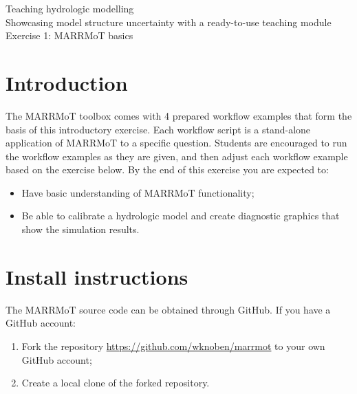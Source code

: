 \documentclass[12pt]{article}
\begin{document}

\begin{center}
Teaching hydrologic modelling\\
Showcasing model structure uncertainty with a ready-to-use teaching module \\
\vspace*{3mm}
Exercise 1: MARRMoT basics\\
\end{center}

\bigskip


\section{Introduction}

The MARRMoT toolbox comes with 4 prepared workflow examples that form the basis of this introductory exercise. Each workflow script is a stand-alone application of MARRMoT to a specific question. Students are encouraged to run the workflow examples as they are given, and then adjust each workflow example based on the exercise below. By the end of this exercise you are expected to:

\begin{itemize}
    \item Have basic understanding of MARRMoT functionality;
    \item Be able to calibrate a hydrologic model and create diagnostic graphics that show the simulation results.
\end{itemize}



\section{Install instructions}

The MARRMoT source code can be obtained through GitHub. If you have a GitHub account:

\begin{enumerate}
	\item Fork the repository \url{https://github.com/wknoben/marrmot} to your own GitHub account;
	\item Create a local clone of the forked repository.
\end{enumerate}
\end{document}
